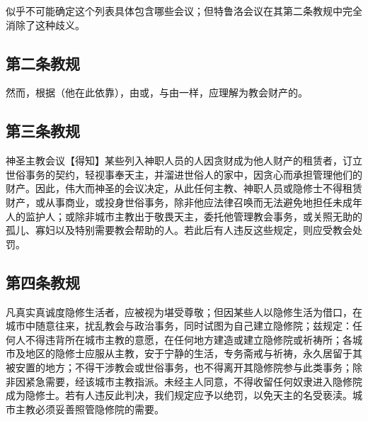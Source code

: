 似乎不可能确定这个列表具体包含哪些会议；但特鲁洛会议在其第二条教规中完全消除了这种歧义。\par


\subsection{第二条教规}

\par

然而，根据（他在此依靠），由或，与由一样，应理解为教会财产的。\par


\subsection{第三条教规}

神圣主教会议【得知】某些列入神职人员的人因贪财成为他人财产的租赁者，订立世俗事务的契约，轻视事奉天主，并溜进世俗人的家中，因贪心而承担管理他们的财产。因此，伟大而神圣的会议决定，从此任何主教、神职人员或隐修士不得租赁财产，或从事商业，或投身世俗事务，除非他应法律召唤而无法避免地担任未成年人的监护人；或除非城市主教出于敬畏天主，委托他管理教会事务，或关照无助的孤儿、寡妇以及特别需要教会帮助的人。若此后有人违反这些规定，则应受教会处罚。\par


\subsection{第四条教规}

凡真实真诚度隐修生活者，应被视为堪受尊敬；但因某些人以隐修生活为借口，在城市中随意往来，扰乱教会与政治事务，同时试图为自己建立隐修院；兹规定：任何人不得违背所在城市主教的意愿，在任何地方建造或建立隐修院或祈祷所；各城市及地区的隐修士应服从主教，安于宁静的生活，专务斋戒与祈祷，永久居留于其被安置的地方；不得干涉教会或世俗事务，也不得离开其隐修院参与此类事务；除非因紧急需要，经该城市主教指派。未经主人同意，不得收留任何奴隶进入隐修院成为隐修士。若有人违反此判决，我们规定应予以绝罚，以免天主的名受亵渎。城市主教必须妥善照管隐修院的需要。\par

